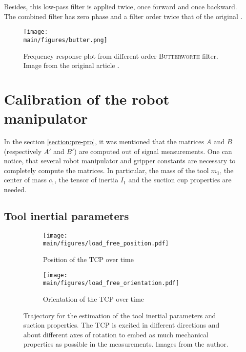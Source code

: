 \documentclass[/home/francois/latex/report/main.tex]{subfiles}
\begin{document}
Besides, this low-pass filter is applied twice, once forward and once backward. The combined filter has zero phase and a filter order twice that of the original \cite{SciPy2019}.

\begin{figure}[h]
  \centering
  \texttt{[image: \\main/figures/butter.png]}
  \caption{Frequency response plot from different order \textsc{Butterworth} filter. Image from the original article  \cite{filter1923}.}
  \label{fig:method:butter}
\end{figure}

\section{Calibration of the robot manipulator}

In the section \ref{section:pre-pro}, it was mentioned that the matrices $A$ and $B$ (respectively $A'$ and $B'$) are computed out of signal measurements. One can notice, that several robot manipulator and gripper constants are necessary to completely compute the matrices. In particular, the mass of the tool $m_1$, the center of mass $c_1$, the tensor of inertia $I_1$ and the suction cup properties are needed.

\subsection{Tool inertial parameters}
\label{method:calib:tool}


\begin{figure}[h]
\centering
\begin{subfigure}{\textwidth}
\centering
\texttt{[image: \\main/figures/load\_free\_position.pdf]}
\caption{Position of the \ac{TCP} over time}
\label{fig:method:position}
\end{subfigure}
\begin{subfigure}{\textwidth}
\centering
\texttt{[image: \\main/figures/load\_free\_orientation.pdf]}
\caption{Orientation of the \ac{TCP} over time}
\label{fig:method:orientation}
\end{subfigure}
\caption{Trajectory for the estimation of the tool inertial parameters and suction properties. The \ac{TCP} is excited in different directions and about different axes of rotation to embed as much mechanical properties as possible in the measurements. Images from the author.}
\label{fig:method:trajectory}
\end{figure}
\end{document}
